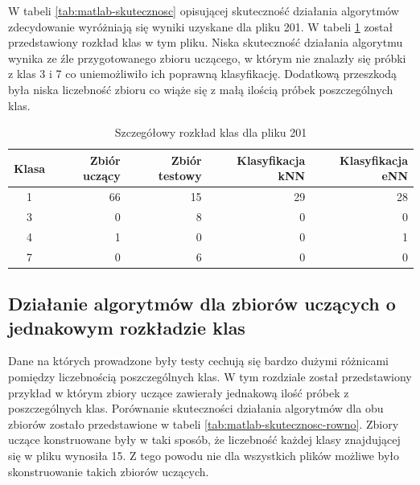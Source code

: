 W tabeli \ref{tab:matlab-skutecznosc} opisującej skuteczność działania algorytmów zdecydowanie wyróżniają się wyniki uzyskane dla pliku 201. W tabeli \ref{tab:matlab-plik201} został przedstawiony rozkład klas w tym pliku. Niska skuteczność działania algorytmu wynika ze źle przygotowanego zbioru uczącego, w którym nie znalazły się próbki z klas 3 i 7 co uniemożliwiło ich poprawną klasyfikację. Dodatkową przeszkodą była niska liczebność zbioru co wiąże się z małą ilością próbek poszczególnych klas.

\begin{table}[H]
	\centering
	\begin{tabular}{|c|r|r|r|r|}
		\hline
		
		Klasa & Zbiór uczący & Zbiór testowy & Klasyfikacja kNN & Klasyfikacja eNN \\
		\hline
		1 & 66 & 15 & 29 & 28 \\
		\hline 
		3 & 0 & 8 & 0 & 0 \\
		\hline
		4 & 1 & 0 & 0 & 1 \\
		\hline
		7 & 0 & 6 & 0 & 0 \\
		\hline
		
	\end{tabular}
	\caption{Szczegółowy rozkład klas dla pliku 201}
	\label{tab:matlab-plik201}
\end{table}

\subsection{Działanie algorytmów dla zbiorów uczących o jednakowym rozkładzie klas}

Dane na których prowadzone były testy cechują się bardzo dużymi różnicami pomiędzy liczebnością poszczególnych klas. W tym rozdziale został przedstawiony przykład w którym zbiory uczące zawierały jednakową ilość próbek z poszczególnych klas. Porównanie skuteczności działania algorytmów dla obu zbiorów zostało przedstawione w tabeli \ref{tab:matlab-skutecznosc-rowno}. Zbiory uczące konstruowane były w taki sposób, że liczebność każdej klasy znajdującej się w pliku wynosiła 15. Z tego powodu nie dla wszystkich plików możliwe było skonstruowanie takich zbiorów uczących.

